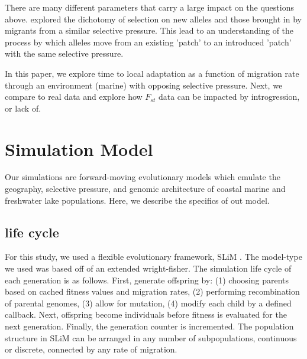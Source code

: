 \documentclass{article}
\begin{document}
There are many different parameters that carry a large impact on the questions above.
\citet{Ralph2015} 
explored the dichotomy of selection on new alleles and those brought in by migrants from a similar selective pressure.
This lead to an understanding of the process by which alleles move from an existing 'patch' to an introduced 'patch' with the 
same selective pressure. 

In this paper, we explore time to local adaptation as a function of migration rate through an environment (marine) with opposing selective pressure. 
Next, we compare to real data and explore how $F_{st}$ data can be impacted by introgression, or lack of.


\section{Simulation Model}

Our simulations are forward-moving evolutionary models which
emulate the geography, selective pressure, and genomic architecture 
of coastal marine and freshwater lake populations. 
Here, we describe the specifics of out model.

\subsection*{life cycle}

For this study, we used a flexible evolutionary framework, SLiM \citep{Haller2017}.
The model-type we used was based off of an extended wright-fisher. 
The simulation life cycle of each generation is as follows.
First, generate offspring by:
(1) choosing parents based on cached fitness values and migration rates, 
(2) performing recombination of parental genomes, 
(3) allow for mutation, 
(4) modify each child by a defined callback. 
Next, offspring become individuals before fitness is evaluated for the next generation.
Finally, the generation counter is incremented. 
The population structure in SLiM can be arranged in any number of subpopulations, 
continuous or discrete, connected by any rate of migration. 
\end{document}
